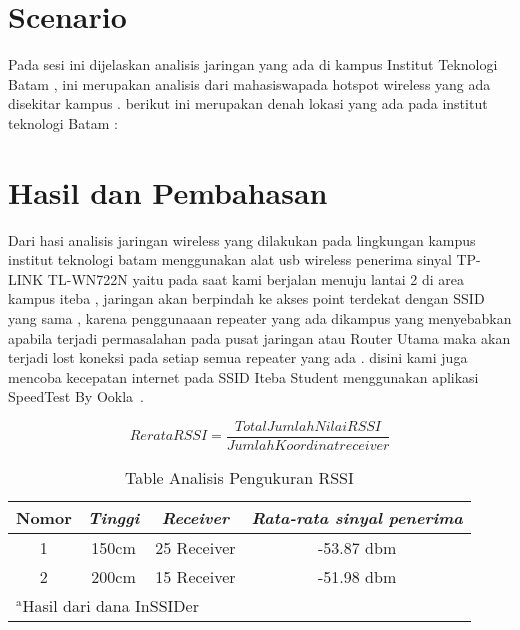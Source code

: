 \documentclass[conference]{IEEEtran}
\begin{document}
\section{Scenario}
Pada sesi ini dijelaskan analisis jaringan yang ada di kampus Institut Teknologi Batam , ini merupakan analisis dari mahasiswapada hotspot wireless yang ada disekitar kampus . berikut ini merupakan denah lokasi yang ada pada institut teknologi Batam :
\section{Hasil dan Pembahasan}

Dari hasi analisis jaringan wireless yang dilakukan pada lingkungan kampus
institut teknologi batam menggunakan alat usb wireless penerima sinyal TP-LINK TL-WN722N yaitu pada saat kami berjalan menuju lantai 2 di area kampus iteba , jaringan akan berpindah
ke akses point terdekat dengan SSID yang sama , karena penggunaaan repeater yang ada dikampus yang menyebabkan apabila terjadi permasalahan
pada pusat jaringan atau Router Utama maka akan terjadi lost koneksi pada setiap semua repeater yang ada .
disini kami juga mencoba kecepatan internet pada SSID Iteba Student menggunakan aplikasi SpeedTest By Ookla~\cite{Ookla}.

\begin{equation}
    Rerata RSSI = \frac{Total Jumlah Nilai RSSI}{Jumlah Koordinat receiver}
    \label{rerata_rssi}
\end{equation}

\begin{table}[htbp]
    \caption{Table Analisis Pengukuran RSSI}
    \begin{center}
    \begin{tabular}{|c|c|c|c|}
        \hline
    \textbf{Nomor} & \textbf{\textit{Tinggi}}& \textbf{\textit{Receiver}}& \textbf{\textit{Rata-rata sinyal penerima}} \\
    \hline
    1 & 150cm& 25 Receiver & -53.87 dbm  \\
    \hline
    2 & 200cm& 15 Receiver & -51.98 dbm  \\
    \hline
    \multicolumn{4}{l}{$^{\mathrm{a}}$Hasil dari dana InSSIDer}
    \end{tabular}
    \label{tab1}
    \end{center}
    \end{table}
\end{document}
